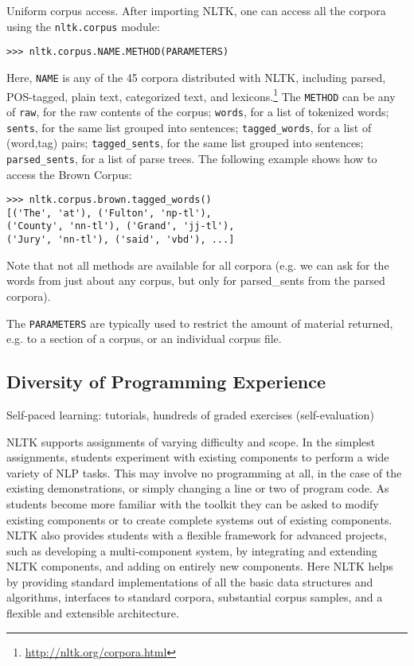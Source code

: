 \documentclass[11pt]{article}
\begin{document}
Uniform corpus access.  After importing NLTK, one can access all the corpora
using the \texttt{nltk.corpus} module:

{\small\begin{verbatim}
>>> nltk.corpus.NAME.METHOD(PARAMETERS)
\end{verbatim}}

Here, \texttt{NAME} is any of the 45 corpora distributed with NLTK, including
parsed, POS-tagged, plain text, categorized text, and lexicons.\footnote{\url{http://nltk.org/corpora.html}}
The \texttt{METHOD} can be any of
\texttt{raw}, for the raw contents of the corpus;
\texttt{words}, for a list of tokenized words;
\texttt{sents}, for the same list grouped into sentences;
\texttt{tagged_words}, for a list of (word,tag) pairs;
\texttt{tagged_sents}, for the same list grouped into sentences;
\texttt{parsed_sents}, for a list of parse trees.
The following example shows how to access the Brown Corpus:

{\small\begin{verbatim}
>>> nltk.corpus.brown.tagged_words()
[('The', 'at'), ('Fulton', 'np-tl'),
('County', 'nn-tl'), ('Grand', 'jj-tl'),
('Jury', 'nn-tl'), ('said', 'vbd'), ...]
\end{verbatim}}

Note that not all methods are available for all corpora (e.g. we can
ask for the words from just about any corpus, but only for
parsed_sents from the parsed corpora).

The \texttt{PARAMETERS} are typically used to restrict the amount of material returned,
e.g. to a section of a corpus, or an individual corpus file.

\subsection{Diversity of Programming Experience}

Self-paced learning: tutorials, hundreds of graded exercises (self-evaluation)

NLTK supports assignments of varying difficulty and scope. In the
simplest assignments, students experiment with existing components to
perform a wide variety of NLP tasks. This may involve no programming
at all, in the case of the existing demonstrations, or simply changing
a line or two of program code. As students become more familiar with
the toolkit they can be asked to modify existing components or to
create complete systems out of existing components. NLTK also provides
students with a flexible framework for advanced projects, such as
developing a multi-component system, by integrating and extending NLTK
components, and adding on entirely new components. Here NLTK helps by
providing standard implementations of all the basic data structures
and algorithms, interfaces to standard corpora, substantial corpus
samples, and a flexible and extensible architecture.
\end{document}
